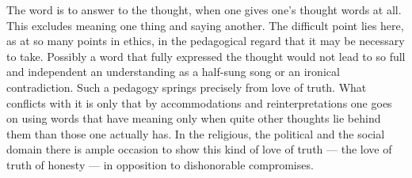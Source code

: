 \documentclass[12pt,a4paper,openany]{book}
\begin{document}
The word is to answer to the thought, when one gives one's thought words at all. This excludes meaning one thing and
saying another. The difficult point lies here, as at so many points in ethics, in the pedagogical regard that it may
be necessary to take. Possibly a word that fully expressed the thought would not lead to so full and independent an
understanding as a half-sung song or an ironical contradiction. Such a pedagogy springs precisely from love of truth.
What conflicts with it is only that by accommodations and reinterpretations one goes on using words that have meaning
only when quite other thoughts lie behind them than those one actually has. In the religious, the political and the
social domain there is ample occasion to show this kind of love of truth --- the love of truth of honesty --- in
opposition to dishonorable compromises.
\end{document}
